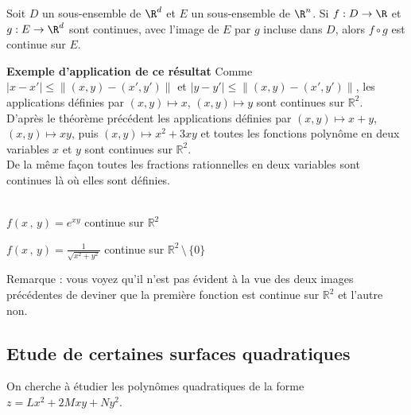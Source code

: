 \documentclass[class=report,crop=false]{standalone}
\begin{document}
\begin{theoreme}
Soit $D$ un sous-ensemble de $\R^d$ et $E$ un sous-ensemble de $\R^n$.
Si $f:D \to \R$ et $g:E \to \R^d$ sont continues, avec l'image de $E$ par $g$ incluse dans $D$, alors $f \circ g$ est continue sur $E$.
\end{theoreme}

{\bf Exemple d'application de ce résultat}
Comme $|x-x'|\leq\|(x,y)-(x',y')\|$ et $|y-y'|\leq\|(x,y)-(x',y')\|$, les applications définies par $(x,y)\mapsto x$, $(x,y)\mapsto y$ sont continues sur $\mathbb{R}^2$.\\
D'apr\`es le théor\`eme précédent les applications définies par $(x,y)\mapsto x+y$, $(x,y)\mapsto xy$, puis $(x,y)\mapsto x^2+3xy$ et toutes les fonctions polyn\^ome en deux variables $x$ et $y$ sont continues sur $\mathbb{R}^2$. \\
De la même fa\c con toutes les fractions rationnelles en deux variables sont continues l\`a o\`u elles sont définies.


\\
$f(x\,,\,y) = e^{xy}$ continue sur $\mathbb{R}^2$\\
\begin{center}
\end{center}
$f(x\,,\,y) = \displaystyle \frac{1}{\sqrt{x^2 + y^2}}$ continue sur $\mathbb{R}^2\,\setminus\,\{0\}$
\begin{center}
\end{center}
Remarque : vous voyez qu'il n'est pas évident \`a la vue des deux images précédentes de deviner que la premi\`ere fonction est continue sur $\mathbb {R}^2$ et l'autre non.



\subsection{Etude de certaines surfaces quadratiques}



On cherche \`a étudier les polyn\^omes  quadratiques de la forme $z = Lx^2 + 2Mxy + Ny^2$.
\end{document}
